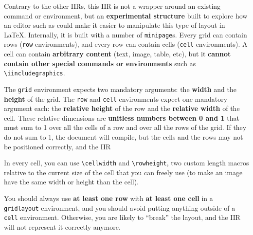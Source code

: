 Contrary to the other IIRs, this IIR is not a wrapper around an existing command or environment, but an \textbf{experimental structure} built to explore how an editor such as \iLaTeX{} could make it easier to manipulate this type of layout in \LaTeX{}.
Internally, it is built with a number of \texttt{minipage}s.
Every grid can contain rows (\texttt{row} environments), and every row can contain cells (\texttt{cell} environments).
A cell can contain \textbf{arbitrary content} (text, image, table, etc), but it \textbf{cannot contain other special commands or environments} such as \verb|\iincludegraphics|.

The \texttt{grid} environment expects two mandatory arguments: the \textbf{width} and the \textbf{height} of the grid.
The \texttt{row} and \texttt{cell} environments expect one mandatory argument each: the \textbf{relative height} of the row and the \textbf{relative width} of the cell.
These relative dimensions are \textbf{unitless numbers between 0 and 1} that must sum to 1 over all the cells of a row and over all the rows of the grid.
If they do not sum to 1, the document will compile, but the cells and the rows may not be positioned correctly, and the IIR 


\begin{info}
    In every cell, you can use \verb|\cellwidth| and \verb|\rowheight|, two custom length macros relative to the current size of the cell that you can freely use (\eg to make an image have the same width or height than the cell).
\end{info}

\begin{warning}
    You should always use \textbf{at least one row} with \textbf{at least one cell} in a \texttt{gridlayout} environment, and you should avoid putting anything outside of a \texttt{cell} environment.
    Otherwise, you are likely to ``break'' the layout, and the IIR will not represent it correctly anymore.
\end{warning}

